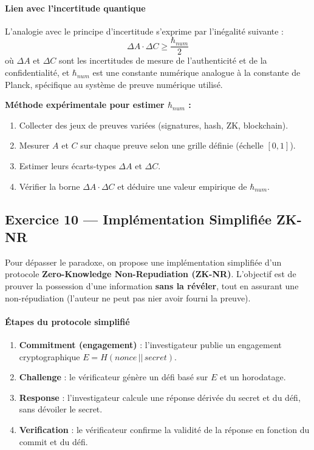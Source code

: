 \documentclass[11pt]{article}
\begin{document}
\paragraph{Lien avec l’incertitude quantique}
L’analogie avec le principe d’incertitude s’exprime par l’inégalité suivante :
\[
\Delta A \cdot \Delta C \geq \frac{\hbar_{num}}{2}
\]
où $\Delta A$ et $\Delta C$ sont les incertitudes de mesure de l’authenticité et de la confidentialité, 
et $\hbar_{num}$ est une constante numérique analogue à la constante de Planck, 
spécifique au système de preuve numérique utilisé.  

\textbf{Méthode expérimentale pour estimer $\hbar_{num}$ :}
\begin{enumerate}
  \item Collecter des jeux de preuves variées (signatures, hash, ZK, blockchain).
  \item Mesurer $A$ et $C$ sur chaque preuve selon une grille définie (échelle $[0,1]$).
  \item Estimer leurs écarts-types $\Delta A$ et $\Delta C$.
  \item Vérifier la borne $\Delta A \cdot \Delta C$ et déduire une valeur empirique de $\hbar_{num}$.
\end{enumerate}

\subsection{Exercice 10 — Implémentation Simplifiée ZK-NR}

Pour dépasser le paradoxe, on propose une implémentation simplifiée d’un protocole \textbf{Zero-Knowledge Non-Repudiation (ZK-NR)}.  
L’objectif est de prouver la possession d’une information \textbf{sans la révéler}, 
tout en assurant une non-répudiation (l’auteur ne peut pas nier avoir fourni la preuve).

\paragraph{Étapes du protocole simplifié}
\begin{enumerate}
  \item \textbf{Commitment (engagement)} : l’investigateur publie un engagement cryptographique $E = H(nonce \, || \, secret)$.
  \item \textbf{Challenge} : le vérificateur génère un défi basé sur $E$ et un horodatage.
  \item \textbf{Response} : l’investigateur calcule une réponse dérivée du secret et du défi, sans dévoiler le secret.
  \item \textbf{Verification} : le vérificateur confirme la validité de la réponse en fonction du commit et du défi.
\end{enumerate}
\end{document}
